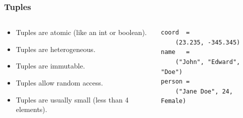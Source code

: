 \documentclass{beamer}
\begin{document}
    \begin{frame}[fragile=singleslide]
        \frametitle{Tuples}

        \begin{columns}[c]
            \begin{column}[T]{5cm}
                \begin{itemize}
                    \item Tuples are atomic (like an int or boolean).
                    \item Tuples are heterogeneous.
                    \item Tuples are immutable.
                    \item Tuples allow random access.
                    \item Tuples are usually small (less than 4 elements).
                \end{itemize}
            \end{column}
            \begin{column}[T]{5cm}
                \begin{lstlisting}
coord  = 
    (23.235, -345.345)
name   = 
    ("John", "Edward", "Doe")
person = 
    ("Jane Doe", 24, Female)
                \end{lstlisting}
            \end{column}
        \end{columns}
    \end{frame}
\end{document}

